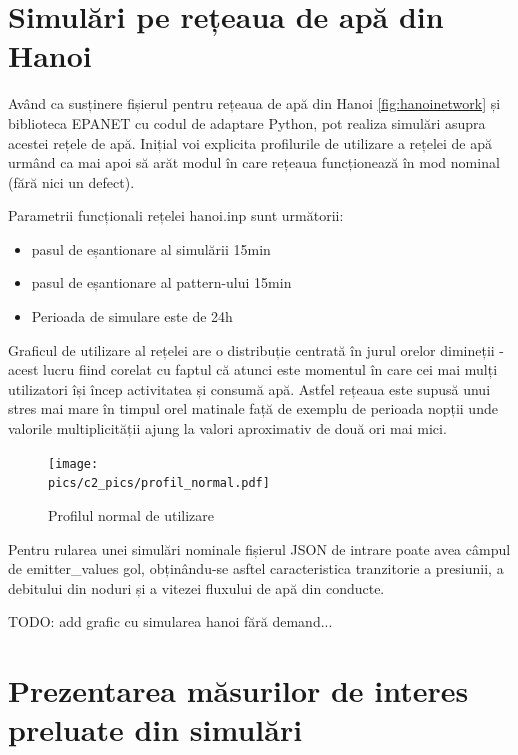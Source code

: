 

\section{Simulări pe rețeaua de apă din Hanoi}

Având ca susținere fișierul pentru rețeaua de apă din Hanoi \ref{fig:hanoinetwork} și biblioteca EPANET cu codul de
adaptare Python, pot realiza simulări asupra acestei rețele de apă. Inițial voi explicita profilurile de utilizare a
rețelei de apă urmând ca mai apoi să arăt modul în care rețeaua funcționează în mod nominal (fără nici un defect).

Parametrii funcționali rețelei hanoi.inp sunt următorii:

\begin{itemize}
    \item pasul de eșantionare al simulării 15min
    \item pasul de eșantionare al pattern-ului 15min
    \item Perioada de simulare este de 24h
\end{itemize}

Graficul de utilizare al rețelei are o distribuție centrată în jurul orelor dimineții - acest lucru fiind corelat cu faptul că atunci este momentul în care cei mai mulți utilizatori își încep activitatea și consumă apă. Astfel rețeaua este supusă unui stres mai mare în timpul orel matinale față de exemplu de perioada nopții unde valorile multiplicității ajung la valori aproximativ de două ori mai mici.

\begin{figure}[htbp]
    \label{fig:normalprofile}
  \centering
  \texttt{[image: \\pics/c2\_pics/profil\_normal.pdf]}
  \caption{Profilul normal de utilizare}
\end{figure}

Pentru rularea unei simulări nominale fișierul JSON de intrare poate avea câmpul de emitter\_values gol, obținându-se asftel caracteristica tranzitorie a presiunii, a debitului din noduri și a vitezei fluxului de apă din conducte.

TODO: add grafic cu simularea hanoi fără demand...

\section{Prezentarea măsurilor de interes preluate din simulări}


